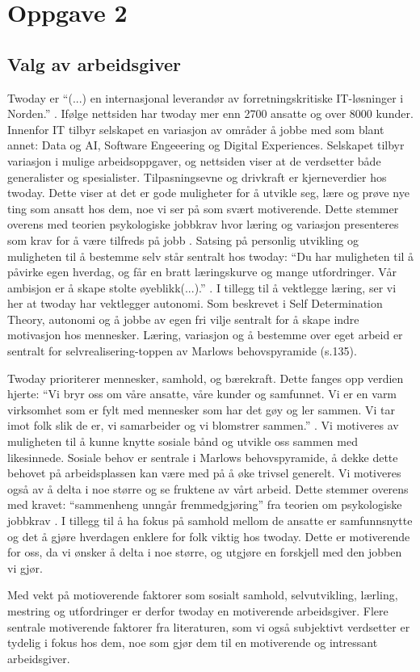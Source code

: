 \section{Oppgave 2}
\subsection{Valg av arbeidsgiver}
Twoday er \enquote{(...) en internasjonal leverandør av forretningskritiske IT-løsninger i Norden.}
\cite{twoday.no}. Ifølge nettsiden har twoday mer enn 2700 ansatte og over 8000 kunder. Innenfor IT
tilbyr selskapet en variasjon av områder å jobbe med som blant annet: Data og AI, Software Engeeering
og Digital Experiences. Selskapet tilbyr variasjon i mulige arbeidsoppgaver, og nettsiden viser at de
verdsetter både generalister og spesialister. Tilpasningsevne og drivkraft er kjerneverdier hos twoday.
Dette viser at det er gode muligheter for å utvikle seg, lære og prøve nye ting som ansatt hos dem,
noe vi ser på som svært motiverende. Dette stemmer overens med teorien psykologiske jobbkrav hvor
læring og variasjon presenteres som krav for å være tilfreds på jobb \parencite[][s.120]{Teknologiledelse}. 
Satsing på personlig utvikling og muligheten til å bestemme selv står sentralt hos twoday: \enquote{Du har muligheten
til å påvirke egen hverdag, og får en bratt læringskurve og mange utfordringer. Vår ambisjon er å
skape stolte øyeblikk(...).} \parencite["Graduateprogrammet"]{twoday.no}. I tillegg til å vektlegge læring, ser
vi her at twoday har vektlegger autonomi. Som beskrevet i Self Determination Theory\parencite[][s.121]{Teknologiledelse},
autonomi og å jobbe av egen fri vilje sentralt for å skape indre motivasjon hos mennesker. Læring,
variasjon og å bestemme over eget arbeid er sentralt for selvrealisering-toppen av Marlows
behovspyramide \parencite[][s.116]{Teknologiledelse}(s.135).

Twoday prioriterer mennesker, samhold, og bærekraft. Dette fanges opp verdien hjerte:
“Vi bryr oss om våre ansatte, våre kunder og samfunnet. Vi er en varm virksomhet som er fylt
med mennesker som har det gøy og ler sammen. Vi tar imot folk slik de er, vi samarbeider og vi
blomstrer sammen.” \parencite["Om oss"]{twoday.no}. Vi motiveres av muligheten til å kunne knytte sosiale bånd
og utvikle oss sammen med likesinnede. Sosiale behov er sentrale i Marlows behovspyramide, å dekke
dette behovet på arbeidsplassen kan være med på å øke trivsel generelt. Vi motiveres også av å delta
i noe større og se fruktene av vårt arbeid. Dette stemmer overens med kravet: “sammenheng unngår
fremmedgjøring” fra teorien om psykologiske jobbkrav \parencite[][s.120]{Teknologiledelse}. I tillegg til å ha fokus på samhold
mellom de ansatte er samfunnsnytte og det å gjøre hverdagen enklere for folk viktig hos
twoday\parencite["Graduateprogrammet"]{twoday.no}. Dette er motiverende for oss, da vi ønsker å delta i noe
større, og utgjøre en forskjell med den jobben vi gjør.

Med vekt på motioverende faktorer som sosialt samhold, selvutvikling, lærling, mestring og utfordringer er derfor
twoday en motiverende arbeidsgiver. Flere sentrale motiverende faktorer fra literaturen, som vi også subjektivt verdsetter
er tydelig i fokus hos dem, noe som gjør dem til en motiverende og intressant arbeidsgiver. 